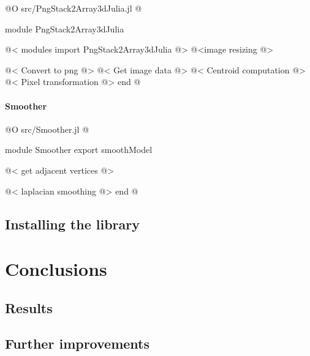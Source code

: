 \documentclass[11pt,oneside]{article}	%
\begin{document}
@O src/PngStack2Array3dJulia.jl
@{module PngStack2Array3dJulia

@< modules import PngStack2Array3dJulia @>
@<image resizing @>

@< Convert to png @>
@< Get image data @>
@< Centroid computation @>
@< Pixel transformation @>
end
@}

\paragraph{Smoother}

@O src/Smoother.jl
@{module Smoother
export smoothModel

@< get adjacent vertices @>

@< laplacian smoothing @>
end
@}


\subsection{Installing the library}

\section{Conclusions}\label{sec:conclusions}
\subsection{Results}

\subsection{Further improvements}



\appendix
\end{document}
